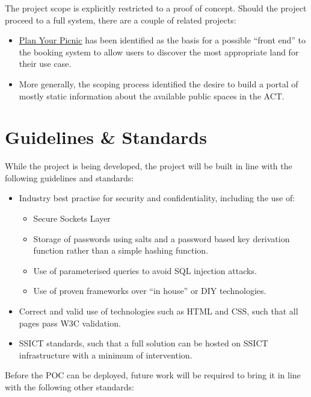 \documentclass[12pt,a4paper,twosided]{article}
\begin{document}
The project scope is explicitly restricted to a proof of concept. Should
the project proceed to a full system, there are a couple of related
projects:

\begin{itemize}
\itemsep1pt\parskip0pt
\item
  \href{http://planyourpicnic.org.au}{Plan Your Picnic} has been
  identified as the basis for a possible ``front end'' to the booking
  system to allow users to discover the most appropriate land for their
  use case.
\item
  More generally, the scoping process identified the desire to build a
  portal of mostly static information about the available public spaces
  in the ACT.
\end{itemize}

\section{Guidelines \& Standards}\label{guidelines-standards}

While the project is being developed, the project will be built in line
with the following guidelines and standards:

\begin{itemize}
\itemsep1pt\parskip0pt
\item
  Industry best practise for security and confidentiality, including the
  use of:

  \begin{itemize}
  \itemsep1pt\parskip0pt
  \item
    Secure Sockets Layer
  \item
    Storage of passwords using salts and a password based key derivation
    function rather than a simple hashing function.
  \item
    Use of parameterised queries to avoid SQL injection attacks.
  \item
    Use of proven frameworks over ``in house'' or DIY technologies.
  \end{itemize}
\item
  Correct and valid use of technologies such as HTML and CSS, such that
  all pages pass W3C validation.
\item
  SSICT standards, such that a full solution can be hosted on SSICT
  infrastructure with a minimum of intervention.
\end{itemize}

Before the POC can be deployed, future work will be required to bring it
in line with the following other standards:
\end{document}
